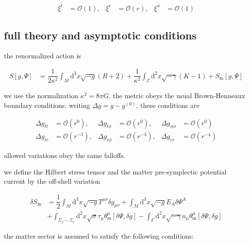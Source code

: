 \begin{align}
\xi ^{t} & =\mathcal{O}(1), & \xi ^{r} & =\mathcal{O}(r), & \xi ^{\phi} & =\mathcal{O}(1)
\end{align}

\subsection{full theory and asymptotic conditions}\label{subsec:full-theory-asymptotic-conditions}

the renormalized action is

\begin{align}
S[g,\Psi] & =\dfrac{1}{2\kappa ^{2}} \int _{M}\mathrm{d}^{3}x\sqrt{ -g }(R+2) +\dfrac{1}{\kappa ^{2}}\int _{\Gamma} \mathrm{d}^{2}x\sqrt{ -\gamma }(K-1) +S_{\mathrm{m}}[g,\Psi]
\end{align}

we use the normalization $\displaystyle{\kappa ^{2}=8\pi G}$. the metric obeys the usual Brown-Henneaux boundary conditions. writing $\displaystyle{\Delta g=g-g^{(0)}}$, these conditions are

\begin{align}
\Delta g_{tt} & =\mathcal{O}(r^{0}), & \Delta g_{t\phi} & =\mathcal{O}(r^{0}), & \Delta g_{\phi \phi} & =\mathcal{O}(r^{0}) \\
\Delta g_{tr} & =\mathcal{O}(r^{-3}), & \Delta g_{r\phi} & =\mathcal{O}(r^{-3}), & \Delta g_{rr} & =\mathcal{O}(r^{-4})
\end{align}

allowed variations obey the same falloffs.

we define the Hilbert stress tensor and the matter pre-symplectic potential current by the off-shell variation

\begin{align}
\delta S_{\mathrm{m}} & =\dfrac{1}{2}\int _{M}\mathrm{d}^{3}x\sqrt{ -g }T^{\mu \nu}\delta g_{\mu \nu}+\int _{M}\mathrm{d}^{3}x\sqrt{ -g }E_{A}\delta \Psi^{A} \\
 & +\int _{\Sigma _{f}-\Sigma _{i}}\mathrm{d}^{2}x\sqrt{ \sigma }\tau _{\mu}\theta _{\mathrm{m}} ^{\mu}[\delta \Psi,\delta g]-\int _{\Gamma}\mathrm{d}^{2}x\sqrt{ -\gamma }n_{\mu}\theta _{\mathrm{m}} ^{\mu}[\delta \Psi,\delta g]
\end{align}

the matter sector is assumed to satisfy the following conditions:

